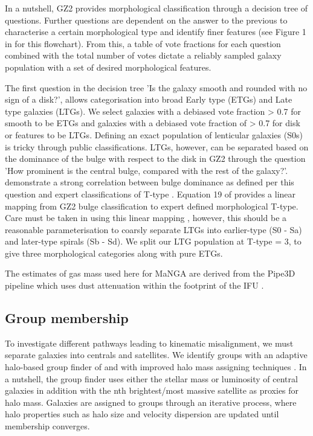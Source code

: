 \documentclass[fleqn,usenatbib]{mnras}
\begin{document}
In a nutshell, GZ2 provides morphological classification through a decision tree of questions. Further questions are dependent on the answer to the previous to characterise a certain morphological type and identify finer features (see Figure 1 in \citep{willett2013} for this flowchart). From this, a table of vote fractions for each question combined with the total number of votes dictate a reliably sampled galaxy population with a set of desired morphological features. 

The first question in the decision tree 'Is the galaxy smooth and rounded with no sign of a disk?', allows categorisation into broad Early type (ETGs) and Late type galaxies (LTGs). We select galaxies with a debiased vote fraction > 0.7 for smooth to be ETGs and galaxies with a debiased vote fraction of > 0.7 for disk or features to be LTGs. Defining an exact population of lenticular galaxies (S0s) is tricky through public classifications. LTGs, however, can be separated based on the dominance of the bulge with respect to the disk in GZ2 through the question 'How prominent is the central bulge, compared with the rest of the galaxy?'. \citep{willett2013} demonstrate a strong correlation between bulge dominance as defined per this question and expert classifications of T-type \citep{nair2010}. Equation 19 of \citet{willett2013} provides a linear mapping from GZ2 bulge classification to expert defined morphological T-type. Care must be taken in using this linear mapping \citep[see discussion in][]{willett2013}, however, this should be a reasonable parameterisation to coarsly separate LTGs into earlier-type (S0 - Sa) and later-type spirals (Sb - Sd). We split our LTG population at T-type = 3, to give three morphological categories along with pure ETGs. 

The estimates of gas mass used here for MaNGA are derived from the Pipe3D pipeline which uses dust attenuation within the footprint of the IFU \citep{pipe3Da, pipe3Dvac}.

\subsection{Group membership} \label{sec:group_def}
To investigate different pathways leading to kinematic misalignment, we must separate galaxies into centrals and satellites. We identify groups with an adaptive halo-based group finder of \citet{yang2005,yang2007} and with improved halo mass assigning techniques \citep[see;][for details and application to SDSS]{lim2017}. In a nutshell, the group finder uses either the stellar mass or luminosity of central galaxies in addition with the nth brightest/most massive satellite as proxies for halo mass. Galaxies are assigned to groups through an iterative process, where halo properties such as halo size and velocity dispersion are updated until membership converges. 
\end{document}

